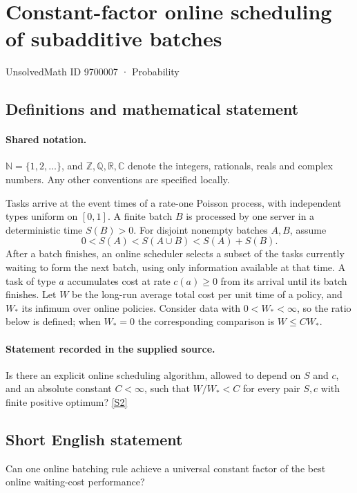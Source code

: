 \documentclass[11pt]{article}
\newcommand{\sref}[2]{\hyperlink{source:#1:#2}{[S#2]}}
\begin{document}
\setcounter{section}{9700006}
\section{Constant-factor online scheduling of subadditive batches}\label{9700007}
{\small\sffamily UnsolvedMath ID 9700007 · Probability}
\subsection{Definitions and mathematical statement}

\paragraph{Shared notation.}$\mathbb N=\{1,2,\ldots\}$, and $\mathbb Z,\mathbb Q,\mathbb R,\mathbb C$ denote the integers, rationals, reals and complex numbers. Any other conventions are specified locally.


Tasks arrive at the event times of a rate-one Poisson process, with independent types uniform on $[0,1]$. A finite batch $B$ is processed by one server in a deterministic time $S(B)>0$. For disjoint nonempty batches $A,B$, assume
\[0<S(A)<S(A\cup B)<S(A)+S(B).\]
After a batch finishes, an online scheduler selects a subset of the tasks currently waiting to form the next batch, using only information available at that time. A task of type $a$ accumulates cost at rate $c(a)\ge0$ from its arrival until its batch finishes. Let $W$ be the long-run average total cost per unit time of a policy, and $W_*$ its infimum over online policies. Consider data with $0<W_*<\infty$, so the ratio below is defined; when $W_*=0$ the corresponding comparison is $W\le C W_*$.
\paragraph{Statement recorded in the supplied source.}
Is there an explicit online scheduling algorithm, allowed to depend on $S$ and $c$, and an absolute constant $C<\infty$, such that $W/W_*<C$ for every pair $S,c$ with finite positive optimum? \sref{9700007}{2}
\subsection{Short English statement}
Can one online batching rule achieve a universal constant factor of the best online waiting-cost performance?
\end{document}
